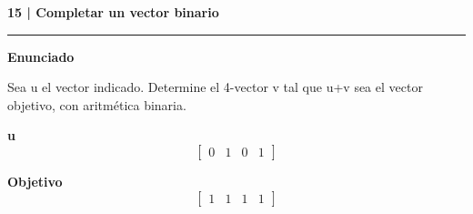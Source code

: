 \documentclass[11pt,a4paper,landscape]{article}
\newcommand{\titulo}[1]{{\LARGE\bfseries #1}\par\smallskip\hrule\medskip}
\begin{document}
\newpage{}\hypertarget{1.2-15}{}
\titulo{15 | Completar un vector binario}
\textbf{Enunciado}\par Sea u el vector indicado. Determine el 4-vector v tal que u+v sea el vector objetivo, con aritmética binaria.
\par\smallskip \begin{minipage}[t]{.47\linewidth}\centering \textbf{u}\[\begin{bmatrix}0 & 1 & 0 & 1\end{bmatrix}\]\end{minipage}\hfill\begin{minipage}[t]{.47\linewidth}\centering \textbf{Objetivo}\[\begin{bmatrix}1 & 1 & 1 & 1\end{bmatrix}\]\end{minipage}\par\smallskip
\end{document}
